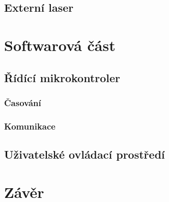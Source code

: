 \documentclass[twoside,project]{../MFFPrace}
\begin{document}
\section{Externí laser}


\chapter{Softwarová část\label{cpt:software}}
\begin{center}
\end{center}
\section{Řídící mikrokontroler}

\subsection{Časování}

\subsection{Komunikace}

\section{Uživatelské ovládací prostředí}

\chapter*{Závěr}
\end{document}

